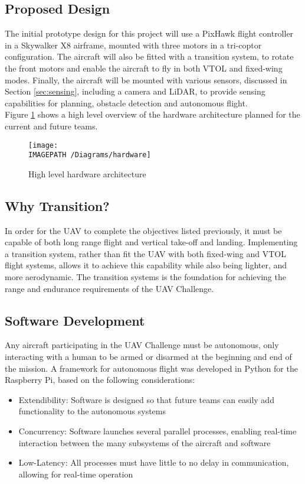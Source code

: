 \subsection{Proposed Design}
The initial prototype design for this project will use a PixHawk flight controller in a Skywalker X8 airframe, mounted with three motors in a tri-coptor configuration. The aircraft will also be fitted with a transition system, to rotate the front motors and enable the aircraft to fly in both VTOL and fixed-wing modes. Finally, the aircraft will be mounted with various sensors, discussed in Section \ref{sec:sensing}, including a camera and LiDAR, to provide sensing capabilities for planning, obstacle detection and autonomous flight.\\

Figure \ref{fig:hardwarearch-exec} shows a high level overview of the hardware architecture planned for the current and future teams.

\begin{figure}[!h]
	\centering
	\texttt{[image: \\IMAGEPATH /Diagrams/hardware]}
	\caption{High level hardware architecture}
	\label{fig:hardwarearch-exec}
\end{figure}

\subsection{Why Transition?}
In order for the UAV to complete the objectives listed previously, it must be capable of both long range flight and vertical take-off and landing. Implementing a transition system, rather than fit the UAV with both fixed-wing and VTOL flight systems, allows it to achieve this capability while also being lighter, and more aerodynamic. The transition systems is the foundation for achieving the range and endurance requirements of the UAV Challenge.

\subsection{Software Development}
Any aircraft participating in the UAV Challenge must be autonomous, only interacting with a human to be armed or disarmed at the beginning and end of the mission. A framework for autonomous flight was developed in Python for the Raspberry Pi, based on the following considerations:
\begin{itemize}
	\item Extendibility: Software is designed so that future teams can easily add functionality to the autonomous systems
	\item Concurrency: Software launches several parallel processes, enabling real-time interaction between the many subsystems of the aircraft and software
	\item Low-Latency: All processes must have little to no delay in communication, allowing for real-time operation 
\end{itemize}

